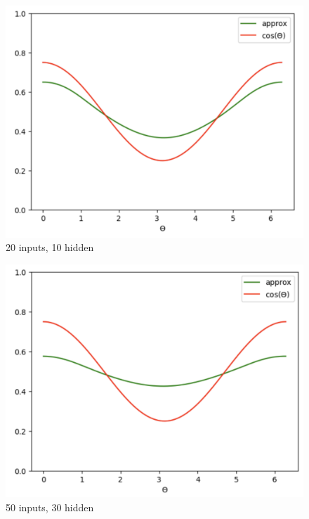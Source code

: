 \documentclass[12pt, a4paper]{article}
\begin{document}
\begin{itemize}
\begin{figure}
        \includegraphics[width=0.5\linewidth]{FNN/FromMingoo/20, 10 parameters.png}
        \caption{20 inputs, 10 hidden}
        \label{fig:enter-label}
    \end{figure}
    \begin{figure}
        \centering
        \includegraphics[width=0.5\linewidth]{FNN/FromMingoo/50, 30 parameters.png}
        \caption{50 inputs, 30 hidden}
        \label{fig:enter-label}
    \end{figure}

\end{itemize}

\newpage
\end{document}

